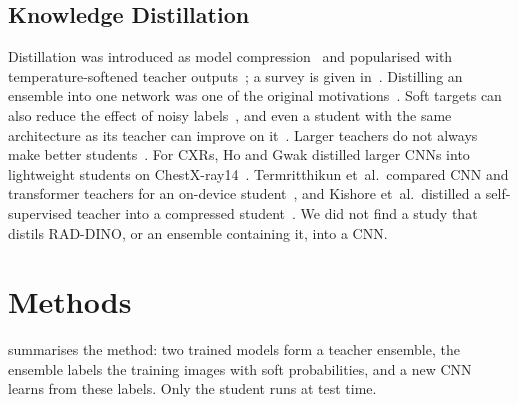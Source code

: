 \documentclass[conference]{IEEEtran}
\begin{document}
\subsection{Knowledge Distillation}
Distillation was introduced as model compression~\cite{bucilua2006model} and popularised with temperature-softened teacher outputs~\cite{hinton2015distilling}; a survey is given in~\cite{gou2021knowledge}. Distilling an ensemble into one network was one of the original motivations~\cite{bucilua2006model,hinton2015distilling}. Soft targets can also reduce the effect of noisy labels~\cite{li2017noisy}, and even a student with the same architecture as its teacher can improve on it~\cite{furlanello2018born}. Larger teachers do not always make better students~\cite{cho2019efficacy,mirzadeh2020teacher}. For CXRs, Ho and Gwak distilled larger CNNs into lightweight students on ChestX-ray14~\cite{ho2020utilizing}. Termritthikun et~al.\ compared CNN and transformer teachers for an on-device student~\cite{termritthikun2024explainable}, and Kishore et~al.\ distilled a self-supervised teacher into a compressed student~\cite{kishore2025enhancing}. We did not find a study that distils RAD-DINO, or an ensemble containing it, into a CNN.

\section{Methods}
\label{sec:methods}

 summarises the method: two trained models form a teacher ensemble, the ensemble labels the training images with soft probabilities, and a new CNN learns from these labels. Only the student runs at test time.
\end{document}
